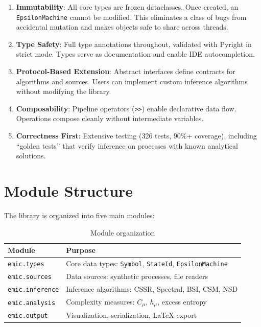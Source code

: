 \documentclass[11pt,a4paper]{report}
\theoremstyle{definition}
\theoremstyle{plain}
\newcommand{\Cmu}{C_\mu}
\newcommand{\hmu}{h_\mu}
\begin{document}
\begin{enumerate}
    \item \textbf{Immutability}: All core types are frozen dataclasses. Once created, an \texttt{EpsilonMachine} cannot be modified. This eliminates a class of bugs from accidental mutation and makes objects safe to share across threads.

    \item \textbf{Type Safety}: Full type annotations throughout, validated with Pyright in strict mode. Types serve as documentation and enable IDE autocompletion.

    \item \textbf{Protocol-Based Extension}: Abstract interfaces define contracts for algorithms and sources. Users can implement custom inference algorithms without modifying the library.

    \item \textbf{Composability}: Pipeline operators (\texttt{>>}) enable declarative data flow. Operations compose cleanly without intermediate variables.

    \item \textbf{Correctness First}: Extensive testing (326 tests, 90\%+ coverage), including ``golden tests'' that verify inference on processes with known analytical solutions.
\end{enumerate}

\section{Module Structure}

The library is organized into five main modules:

\begin{table}[h]
\centering
\caption{Module organization}
\label{tab:modules}
\begin{tabular}{ll}
\toprule
Module & Purpose \\
\midrule
\texttt{emic.types} & Core data types: \texttt{Symbol}, \texttt{StateId}, \texttt{EpsilonMachine} \\
\texttt{emic.sources} & Data sources: synthetic processes, file readers \\
\texttt{emic.inference} & Inference algorithms: CSSR, Spectral, BSI, CSM, NSD \\
\texttt{emic.analysis} & Complexity measures: $\Cmu$, $\hmu$, excess entropy \\
\texttt{emic.output} & Visualization, serialization, LaTeX export \\
\bottomrule
\end{tabular}
\end{table}
\end{document}
